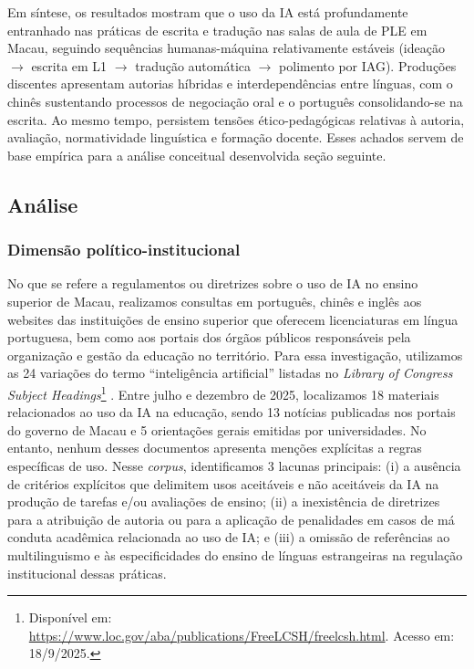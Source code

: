 \documentclass[portuguese]{textolivre}
\begin{document}
Em síntese, os resultados mostram que o uso da IA está profundamente entranhado nas práticas de escrita e tradução nas salas de aula de PLE em Macau, seguindo sequências humanas-máquina relativamente estáveis (ideação $\rightarrow$ escrita em L1 $\rightarrow$ tradução automática $\rightarrow$ polimento por IAG). Produções discentes apresentam autorias híbridas e interdependências entre línguas, com o chinês sustentando processos de negociação oral e o português consolidando-se na escrita. Ao mesmo tempo, persistem tensões ético-pedagógicas relativas à autoria, avaliação, normatividade linguística e formação docente. Esses achados servem de base empírica para a análise conceitual desenvolvida seção seguinte.


\subsection{Análise}\label{sec-ana}

\subsubsection{Dimensão político-institucional}\label{sec-ana-dim}

No que se refere a regulamentos ou diretrizes sobre o uso de IA no ensino superior de Macau, realizamos consultas em português, chinês e inglês aos websites das instituições de ensino superior que oferecem licenciaturas em língua portuguesa, bem como aos portais dos órgãos públicos responsáveis pela organização e gestão da educação no território. Para essa investigação, utilizamos as 24 variações do termo “inteligência artificial” listadas no \textit{Library of Congress Subject Headings}\footnote{Disponível em: \url{https://www.loc.gov/aba/publications/FreeLCSH/freelcsh.html}. Acesso em: 18/9/2025.} . Entre julho e dezembro de 2025, localizamos 18 materiais relacionados ao uso da IA na educação, sendo 13 notícias publicadas nos portais do governo de Macau e 5 orientações gerais emitidas por universidades. No entanto, nenhum desses documentos apresenta menções explícitas a regras específicas de uso. Nesse \textit{corpus}, identificamos 3 lacunas principais: (i) a ausência de critérios explícitos que delimitem usos aceitáveis e não aceitáveis da IA na produção de tarefas e/ou avaliações de ensino; (ii) a inexistência de diretrizes para a atribuição de autoria ou para a aplicação de penalidades em casos de má conduta acadêmica relacionada ao uso de IA; e (iii) a omissão de referências ao multilinguismo e às especificidades do ensino de línguas estrangeiras na regulação institucional dessas práticas.
\end{document}
